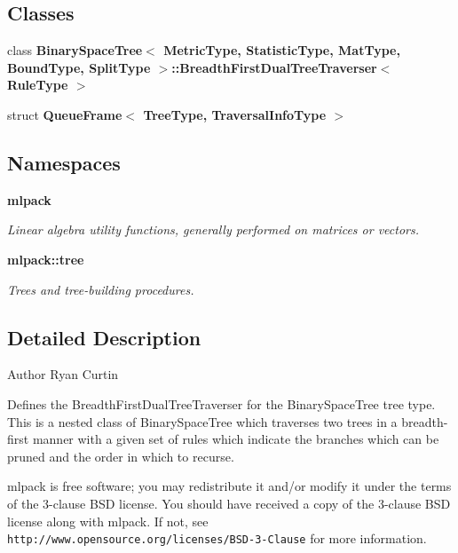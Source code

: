 \subsection*{Classes}
\begin{DoxyCompactItemize}
\item 
class \textbf{ Binary\+Space\+Tree$<$ Metric\+Type, Statistic\+Type, Mat\+Type, Bound\+Type, Split\+Type $>$\+::\+Breadth\+First\+Dual\+Tree\+Traverser$<$ Rule\+Type $>$}
\item 
struct \textbf{ Queue\+Frame$<$ Tree\+Type, Traversal\+Info\+Type $>$}
\end{DoxyCompactItemize}
\subsection*{Namespaces}
\begin{DoxyCompactItemize}
\item 
 \textbf{ mlpack}
\begin{DoxyCompactList}\small\item\em Linear algebra utility functions, generally performed on matrices or vectors. \end{DoxyCompactList}\item 
 \textbf{ mlpack\+::tree}
\begin{DoxyCompactList}\small\item\em Trees and tree-\/building procedures. \end{DoxyCompactList}\end{DoxyCompactItemize}


\subsection{Detailed Description}
\begin{DoxyAuthor}{Author}
Ryan Curtin
\end{DoxyAuthor}
Defines the Breadth\+First\+Dual\+Tree\+Traverser for the Binary\+Space\+Tree tree type. This is a nested class of Binary\+Space\+Tree which traverses two trees in a breadth-\/first manner with a given set of rules which indicate the branches which can be pruned and the order in which to recurse.

mlpack is free software; you may redistribute it and/or modify it under the terms of the 3-\/clause B\+SD license. You should have received a copy of the 3-\/clause B\+SD license along with mlpack. If not, see {\tt http\+://www.\+opensource.\+org/licenses/\+B\+S\+D-\/3-\/\+Clause} for more information. 